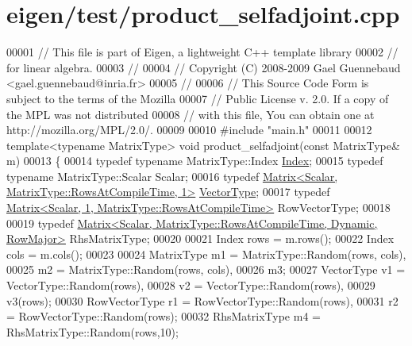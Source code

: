 \hypertarget{eigen_2test_2product__selfadjoint_8cpp_source}{}\section{eigen/test/product\+\_\+selfadjoint.cpp}
\label{eigen_2test_2product__selfadjoint_8cpp_source}

\begin{DoxyCode}
00001 \textcolor{comment}{// This file is part of Eigen, a lightweight C++ template library}
00002 \textcolor{comment}{// for linear algebra.}
00003 \textcolor{comment}{//}
00004 \textcolor{comment}{// Copyright (C) 2008-2009 Gael Guennebaud <gael.guennebaud@inria.fr>}
00005 \textcolor{comment}{//}
00006 \textcolor{comment}{// This Source Code Form is subject to the terms of the Mozilla}
00007 \textcolor{comment}{// Public License v. 2.0. If a copy of the MPL was not distributed}
00008 \textcolor{comment}{// with this file, You can obtain one at http://mozilla.org/MPL/2.0/.}
00009 
00010 \textcolor{preprocessor}{#include "main.h"}
00011 
00012 \textcolor{keyword}{template}<\textcolor{keyword}{typename} MatrixType> \textcolor{keywordtype}{void} product\_selfadjoint(\textcolor{keyword}{const} MatrixType& m)
00013 \{
00014   \textcolor{keyword}{typedef} \textcolor{keyword}{typename} MatrixType::Index \hyperlink{namespace_eigen_a62e77e0933482dafde8fe197d9a2cfde}{Index};
00015   \textcolor{keyword}{typedef} \textcolor{keyword}{typename} MatrixType::Scalar Scalar;
00016   \textcolor{keyword}{typedef} \hyperlink{group___core___module_class_eigen_1_1_matrix}{Matrix<Scalar, MatrixType::RowsAtCompileTime, 1>} 
      \hyperlink{struct_vector_type}{VectorType};
00017   \textcolor{keyword}{typedef} \hyperlink{group___core___module_class_eigen_1_1_matrix}{Matrix<Scalar, 1, MatrixType::RowsAtCompileTime>} 
      RowVectorType;
00018 
00019   \textcolor{keyword}{typedef} \hyperlink{group___core___module_class_eigen_1_1_matrix}{Matrix<Scalar, MatrixType::RowsAtCompileTime, Dynamic, RowMajor>}
       RhsMatrixType;
00020 
00021   Index rows = m.rows();
00022   Index cols = m.cols();
00023 
00024   MatrixType m1 = MatrixType::Random(rows, cols),
00025              m2 = MatrixType::Random(rows, cols),
00026              m3;
00027   VectorType v1 = VectorType::Random(rows),
00028              v2 = VectorType::Random(rows),
00029              v3(rows);
00030   RowVectorType r1 = RowVectorType::Random(rows),
00031                 r2 = RowVectorType::Random(rows);
00032   RhsMatrixType m4 = RhsMatrixType::Random(rows,10);

\end{DoxyCode}
